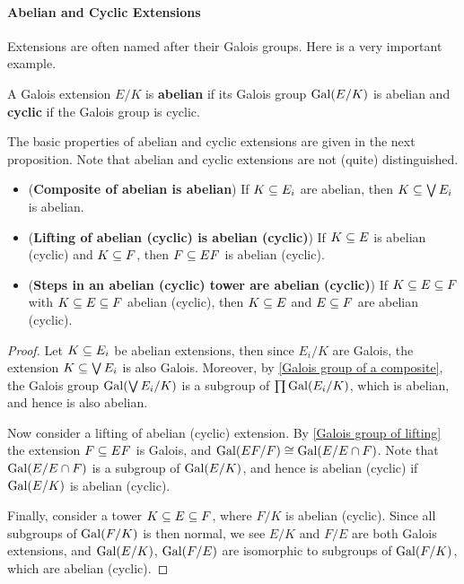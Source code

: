 \paragraph{Abelian and Cyclic Extensions}
Extensions are often named after their Galois groups. Here is a very important example.
\begin{definition}
A Galois extension $E/K$ is \textbf{abelian} if its Galois group $\mathrm{Gal}(E/K)$ is abelian and \textbf{cyclic} if the Galois group is cyclic.
\end{definition}
The basic properties of abelian and cyclic extensions are given in the next proposition. Note that abelian and cyclic extensions are not (quite) distinguished.
\begin{proposition}\label{field ext abelian cyclic prop}
\mbox{}
\begin{itemize}
\item (\textbf{Composite of abelian is abelian}) If $K\subseteq E_i$ are abelian, then $K\subseteq\bigvee E_i$ is abelian.
\item (\textbf{Lifting of abelian (cyclic) is abelian (cyclic)}) If $K\subseteq E$ is abelian (cyclic) and $K\subseteq F$, then $F\subseteq EF$ is abelian (cyclic).
\item (\textbf{Steps in an abelian (cyclic) tower are abelian (cyclic)}) If $K\subseteq E\subseteq F$ with $K\subseteq E\subseteq F$ abelian (cyclic), then $K\subseteq E$ and $E\subseteq F$ are abelian (cyclic).
\end{itemize}
\end{proposition}
\begin{proof}
Let $K\subseteq E_i$ be abelian extensions, then since $E_i/K$ are Galois, the extension $K\subseteq\bigvee E_i$ is also Galois. Moreover, by \cref{Galois group of a composite}, the Galois group $\mathrm{Gal}(\bigvee E_i/K)$ is a subgroup of $\prod\mathrm{Gal}(E_i/K)$, which is abelian, and hence is also abelian.\par
Now consider a lifting of abelian (cyclic) extension. By \cref{Galois group of lifting} the extension $F\subseteq EF$ is Galois, and $\mathrm{Gal}(EF/F)\cong\mathrm{Gal}(E/E\cap F)$. Note that $\mathrm{Gal}(E/E\cap F)$ is a subgroup of $\mathrm{Gal}(E/K)$, and hence is abelian (cyclic) if $\mathrm{Gal}(E/K)$ is abelian (cyclic).\par
Finally, consider a tower $K\subseteq E\subseteq F$, where $F/K$ is abelian (cyclic). Since all subgroups of $\mathrm{Gal}(F/K)$ is then normal, we see $E/K$ and $F/E$ are both Galois extensions, and $\mathrm{Gal}(E/K)$, $\mathrm{Gal}(F/E)$ are isomorphic to subgroups of $\mathrm{Gal}(F/K)$, which are abelian (cyclic).
\end{proof}
